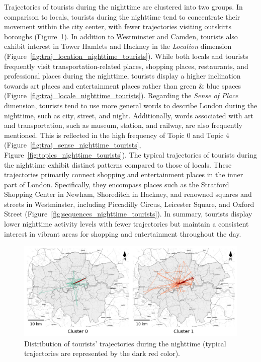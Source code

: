 \documentclass{article}
\theoremstyle{definition}
\theoremstyle{remark}
\begin{document}
Trajectories of tourists during the nighttime are clustered into two groups. In comparison to locals, tourists during the nighttime tend to concentrate their movement within the city center, with fewer trajectories visiting outskirts boroughs (Figure~\ref{fig:traj_distribution_nighttime_tourists}). In addition to Westminster and Camden, tourists also exhibit interest in Tower Hamlets and Hackney in the \textit{Location} dimension (Figure~\ref{fig:traj_location_nighttime_tourists}). While both locals and tourists frequently visit transportation-related places, shopping places, restaurants, and professional places during the nighttime, tourists display a higher inclination towards art places and entertainment places rather than green \& blue spaces (Figure~\ref{fig:traj_locale_nighttime_tourists}). Regarding the \textit{Sense of Place} dimension, tourists tend to use more general words to describe London during the nighttime, such as city, street, and night. Additionally, words associated with art and transportation, such as museum, station, and railway, are also frequently mentioned. This is reflected in the high frequency of Topic 0 and Topic 4 (Figure~\ref{fig:traj_sense_nighttime_tourists}, Figure~\ref{fig:topics_nighttime_tourists}). The typical trajectories of tourists during the nighttime exhibit distinct patterns compared to those of locals. These trajectories primarily connect shopping and entertainment places in the inner part of London. Specifically, they encompass places such as the Stratford Shopping Center in Newham, Shoreditch in Hackney, and renowned squares and streets in Westminster, including Piccadilly Circus, Leicester Square, and Oxford Street (Figure~\ref{fig:sequences_nighttime_tourists}). In summary, tourists display lower nighttime activity levels with fewer trajectories but maintain a consistent interest in vibrant areas for shopping and entertainment throughout the day.

\begin{figure}[!h]
\centering
\includegraphics[width=1\textwidth]{figures/traj_distribution_nighttime_tourists.png}
\caption{\label{fig:traj_distribution_nighttime_tourists}Distribution of tourists' trajectories during the nighttime (typical trajectories are represented by the dark red color).}
\end{figure}
\end{document}
